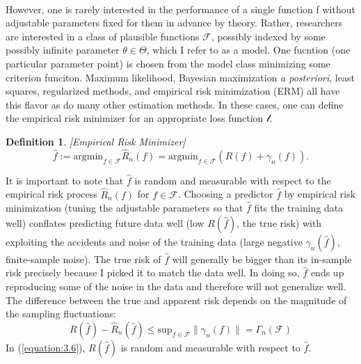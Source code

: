 \documentclass{article}
\def\cF{\ensuremath{\mathcal{F}}}
\theoremstyle{plain}
\newtheorem{definition}[theorem]{Definition}
\renewcommand{\hat}[1]{\widehat{#1}}
\begin{document}
\paragraph{} However, one is rarely interested in the performance of a single function f without adjustable parameters fixed for them in 
advance by theory. Rather, researchers are interested in a class of plausible functions \cF, possibly indexed by some possibly infinite
parameter $\theta \in \Theta$, which I refer to as a model. One fucntion (one particular parameter point) is chosen from the model class 
minimizing some criterion funciton. Maximum likelihood, Bayesian maximization \textit{a posteriori}, least squares, regularized methods, 
and empirical risk minimization (ERM) all have this flavor as do many other estimation methods. In these cases, one can define the 
empirical risk minimizer for an appropriate loss function $\mathcal{l}$. 
\begin{definition}\label{def:Empirical_Risk_Minimizer}[Empirical Risk Minimizer]
\begin{equation}
\hat{f} := \mathrm{argmin}_{f \in \cF} \hat{R}_{n} (f) = \mathrm{argmin}_{f \in \cF} (R(f) + \gamma_n(f)).
\end{equation}\end{definition} 
It is important to note that $\hat{f}$ is random and measurable with respect to the empirical risk process $\hat{R}_n(f)$
for $f \in \cF$. Choosing a predictor $\hat{f}$ by empirical risk minimization (tuning the adjustable parameters so that $\hat{f}$
fits the training data well) conflates predicting future data well (low $R(\hat{f})$, the true risk) with exploiting the accidents and noise of the 
training data (large negative $\gamma_n(\hat{f})$, finite-sample noise). The true risk of $\hat{f}$ will generally be bigger than its in-sample risk 
precisely because I picked it to match the data well. In doing so, $\hat{f}$ ends up reproducing some of the noise in the data and therefore will not
generalize well. The difference between the true and apparent risk depends on the magnitude of the sampling fluctuations:
\begin{equation}\label{equation:3.6}
R(\hat{f}) - \hat{R}_{n}(\hat{f}) \leq \mathrm{sup}_{f\in \cF} \|\gamma_n(f)\| = \Gamma_n(\cF)
\end{equation}
In (\ref{equation:3.6}), $R(\hat{f})$ is random and measurable with respect to $\hat{f}$.
\end{document}
